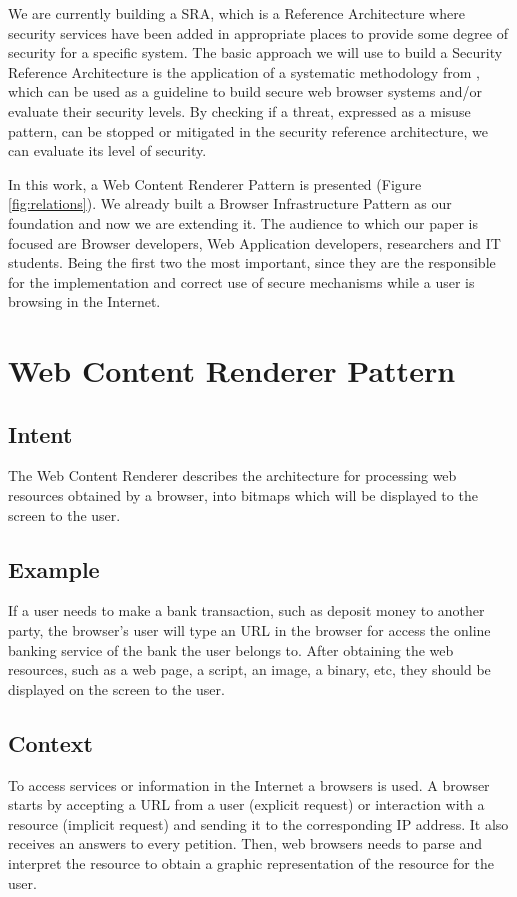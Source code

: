 \documentclass[prodmode,acmtecs]{acmsmall}
\begin{document}
We are currently building a SRA, which is a Reference Architecture where security services have been added in appropriate places to provide some degree of security for a specific system. The basic approach we will use to build a Security Reference Architecture is the application of a systematic methodology from \cite{fernandez2006methodology,Fernandez2011,Fernandez2015}, which can be used as a guideline to build secure web browser systems and/or evaluate their security levels. By checking if a threat, expressed as a misuse pattern, can be stopped or mitigated in the security reference architecture, we can evaluate its level of security.

In this work, a Web Content Renderer Pattern is presented (Figure \ref{fig:relations}). We already built a Browser Infrastructure Pattern as our foundation and now we are extending it. The audience to which our paper is focused are Browser developers, Web Application developers, researchers and IT students. Being the first two the most important, since they are the responsible for the implementation and correct use of secure mechanisms while a user is browsing in the Internet. 


\section{Web Content Renderer Pattern}

  \subsection*{Intent}

  The Web Content Renderer describes the architecture for processing web resources obtained by a browser, into bitmaps which will be displayed to the screen to the user.

  \subsection*{Example}
  If a user needs to make a bank transaction, such as deposit money to another party, the browser's user will type an URL in the browser for access the online banking service of the bank the user belongs to. After obtaining the web resources, such as a web page, a script, an image, a binary, etc, they should be displayed on the screen to the user.
  
  \subsection*{Context}
  To access services or information in the Internet a browsers is used. A browser starts by accepting a URL from a user (explicit request) or interaction with a resource (implicit request) and sending it to the corresponding IP address. It also receives an answers to every petition. Then, web browsers needs to parse and interpret the resource to obtain a graphic representation of the resource for the user.
\end{document}
